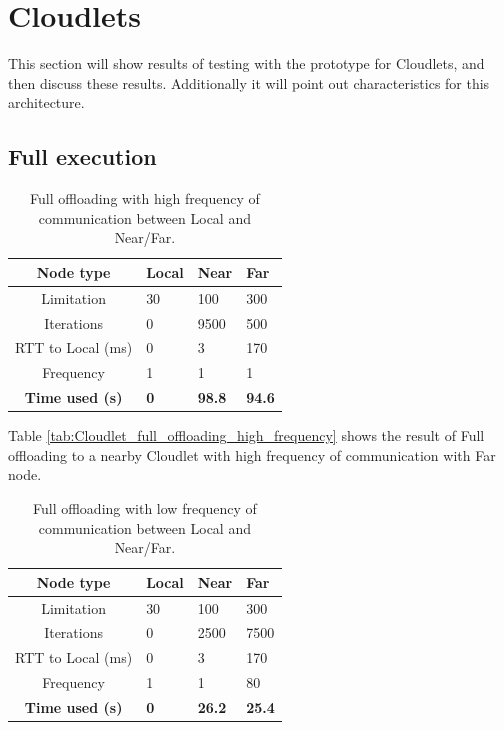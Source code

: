 

\section{Cloudlets}

This section will show results of testing with the prototype for Cloudlets, and then discuss these results. Additionally it will point out characteristics for this architecture.


\subsection{Full execution}



\begin{table}[h!]
    \centering
    \begin{tabular}[c]{|c||p{2cm}|p{2cm}|p{2cm}|}
        \hline
        Node type & Local & Near & Far \\
        \hline
        Limitation          & 30 & 100 & 300  \\
        \hline
        Iterations          & 0 & 9500 & 500  \\
        \hline
        RTT to Local (ms)   & 0 & 3 & 170 \\
        \hline
        Frequency           & 1 & 1 & 1 \\
        \hline
        \hline
        \hline
        \textbf{Time used (s)}       & \textbf{0} & \textbf{98.8} & \textbf{94.6} \\
        \hline
    \end{tabular}
    \caption{Full offloading with high frequency of communication between Local and Near/Far.}
    \label{tab:MEC_full_offloading_high_frequency}
\end{table}

Table \ref{tab:Cloudlet_full_offloading_high_frequency} shows the result of Full offloading to a nearby Cloudlet with high frequency of communication with Far node.

\begin{table}[h!]
    \centering
    \begin{tabular}[c]{|c||p{2cm}|p{2cm}|p{2cm}|}
        \hline
        Node type & Local & Near & Far \\
        \hline
        Limitation          & 30 & 100 & 300  \\
        \hline
        Iterations          & 0 & 2500 & 7500  \\
        \hline
        RTT to Local (ms)   & 0 & 3 & 170 \\
        \hline
        Frequency           & 1 & 1 & 80 \\
        \hline
        \hline
        \hline
        \textbf{Time used (s)}       & \textbf{0} & \textbf{26.2} & \textbf{25.4} \\
        \hline
    \end{tabular}
    \caption{Full offloading with low frequency of communication between Local and Near/Far.}
    \label{tab:Cloudlet_full_offloading_low_frequency}
\end{table}

